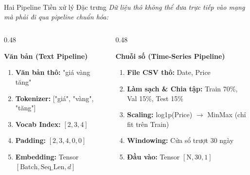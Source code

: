 \documentclass[aspectratio=169, 10pt]{beamer}
\begin{document}
\begin{frame}{Hai Pipeline Tiền xử lý Đặc trưng}
\textit{Dữ liệu thô không thể đưa trực tiếp vào mạng mà phải đi qua pipeline chuẩn hóa:}
\vspace{0.2cm}

\begin{columns}[T]
\begin{column}{0.48\textwidth}
\begin{block}{\textbf{Văn bản (Text Pipeline)}}
\footnotesize
\begin{enumerate}
    \item \textbf{Văn bản thô:} "giá vàng tăng"
    \item \textbf{Tokenizer:} ["giá", "vàng", "tăng"]
    \item \textbf{Vocab Index:} \([2, 3, 4]\)
    \item \textbf{Padding:} \([2, 3, 4, 0, 0]\)
    \item \textbf{Embedding:} Tensor \([\text{Batch}, \text{Seq\_Len}, d]\)
\end{enumerate}
\end{block}
\end{column}

\begin{column}{0.48\textwidth}
\begin{exampleblock}{\textbf{Chuỗi số (Time-Series Pipeline)}}
\small
\begin{enumerate}
    \item \textbf{File CSV thô:} Date, Price
    \item \textbf{Làm sạch \& Chia tập:} Train 70\%, Val 15\%, Test 15\%
    \item \textbf{Scaling:} log1p(Price) \(\rightarrow\) MinMax (chỉ fit trên Train)
    \item \textbf{Windowing:} Cửa sổ trượt 30 ngày
    \item \textbf{Đầu vào:} Tensor \([\text{N}, 30, 1]\)
\end{enumerate}
\end{exampleblock}
\end{column}
\end{columns}
\end{frame}
\end{document}

